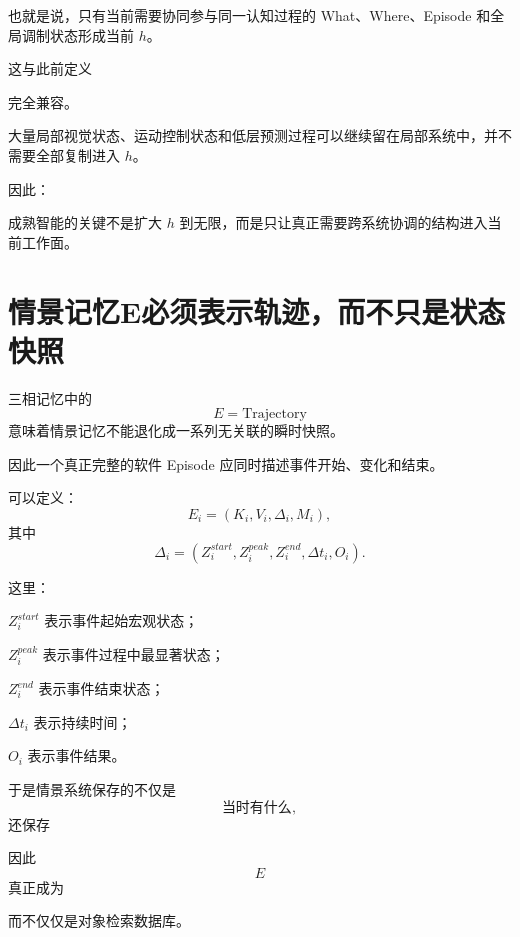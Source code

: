 也就是说，只有当前需要协同参与同一认知过程的 What、Where、Episode 和全局调制状态形成当前 $h$。

这与此前定义
\begin{statementbox}
\centering
{}
\end{statementbox}
完全兼容。

大量局部视觉状态、运动控制状态和低层预测过程可以继续留在局部系统中，并不需要全部复制进入 $h$。

因此：
\begin{statementbox}
\centering
{}
\end{statementbox}

成熟智能的关键不是扩大 $h$ 到无限，而是只让真正需要跨系统协调的结构进入当前工作面。

\section{情景记忆E必须表示轨迹，而不只是状态快照}

三相记忆中的
\[
E=\mathrm{Trajectory}
\]
意味着情景记忆不能退化成一系列无关联的瞬时快照。

因此一个真正完整的软件 Episode 应同时描述事件开始、变化和结束。

可以定义：
\[
E_i
=
(
K_i,
V_i,
\Delta_i,
M_i
),
\]
其中
\[
\Delta_i
=
(
Z_i^{start},
Z_i^{peak},
Z_i^{end},
\Delta t_i,
O_i
).
\]

这里：

$Z_i^{start}$ 表示事件起始宏观状态；

$Z_i^{peak}$ 表示事件过程中最显著状态；

$Z_i^{end}$ 表示事件结束状态；

$\Delta t_i$ 表示持续时间；

$O_i$ 表示事件结果。

于是情景系统保存的不仅是
\[
\text{当时有什么},
\]
还保存
\begin{statementbox}
\centering
{}
\end{statementbox}

因此
\[
E
\]
真正成为
\begin{statementbox}
\centering
{}
\end{statementbox}
而不仅仅是对象检索数据库。

